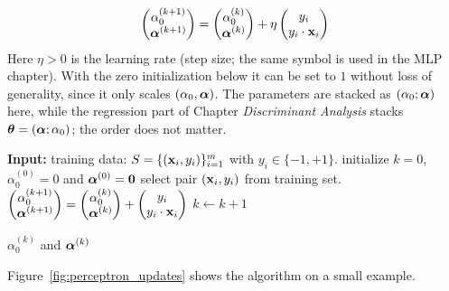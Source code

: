   \begin{displaymath}
    \begin{pmatrix}\alpha_0^{(k+1)}\\ \bm{\mathrm{\alpha}}^{(k+1)}\end{pmatrix} =            \begin{pmatrix}\alpha_0^{(k)}\\ \bm{\mathrm{\alpha}}^{(k)}\end{pmatrix} + \eta \begin{pmatrix}y_i\\ y_i\cdot \bm{\mathrm{x}}_i\end{pmatrix}
  \end{displaymath} 
  Here $\eta>0$ is the learning rate (step size; the same symbol is used in the MLP chapter). With the zero initialization below it can be set to $1$ without loss of generality, since it only scales $(\alpha_0,\bm{\mathrm{\alpha}})$. The parameters are stacked as $(\alpha_0;\bm{\mathrm{\alpha}})$ here, while the regression part of Chapter \emph{Discriminant Analysis} stacks $\bm{\mathrm{\theta}}=(\bm{\mathrm{\alpha}};\alpha_0)$; the order does not matter.
 
  \begin{algorithmic}
    \STATE\textbf{Input:} training data: $S = \{(\bm{\mathrm{x}}_i,y_i)\}_{i=1}^m$ with $y_i\in\{-1,+1\}$.
    \STATE initialize  $k=0$, $\alpha^{(0)}_0=0$ and $\bm{\mathrm{\alpha}}^{(0)}=  \bm{\mathrm{0}}$
    \Repeat
      \STATE select pair $(\bm{\mathrm{x}}_i, y_i)$ from training set.
        \STATE
        \STATE $\displaystyle\begin{pmatrix}\alpha_0^{(k+1)}\\ \bm{\mathrm{\alpha}}^{(k+1)}\end{pmatrix} =  \begin{pmatrix}\alpha_0^{(k)}\\ \bm{\mathrm{\alpha}}^{(k)}\end{pmatrix} +  \begin{pmatrix}y_i\\ y_i\cdot \bm{\mathrm{x}}_i\end{pmatrix}$
        \STATE
        \STATE $k\leftarrow k+1$
      \EndIf

    \STATE {} $\alpha_0^{(k)}$ and $\bm{\mathrm{\alpha}}^{(k)}$
  \end{algorithmic}

Figure~\ref{fig:perceptron_updates} shows the algorithm on a small example.


